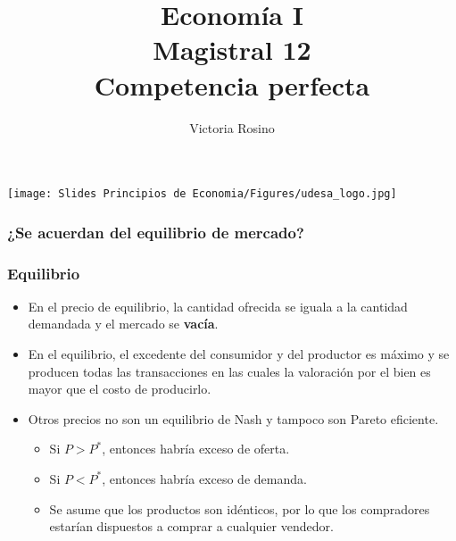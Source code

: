 \documentclass{beamer}
\title[Economía I]{Economía I \vspace{3mm}
\\ Magistral 12 \vspace{3mm} \\ Competencia perfecta}
\date{}
\author[Victoria Rosino]{Victoria Rosino}
\institute[]{Universidad de San Andrés}
\begin{document}
\begin{frame}
\vspace{0.3cm}
\titlepage
\centering
\vspace{-0.9cm}
\texttt{[image: Slides Principios de Economia/Figures/udesa\_logo.jpg]} 
\end{frame}


\begin{frame}
\frametitle{¿Se acuerdan del equilibrio de mercado?}
\begin{figure} [H]
\centering
{}
\end{figure} 
\end{frame}

\begin{frame}
\frametitle{Equilibrio}
\begin{itemize}
    \item En el precio de equilibrio, la cantidad ofrecida se iguala a la cantidad demandada y el mercado se \textbf{vacía}.
    \item En el equilibrio, el excedente del consumidor y del productor es máximo y se producen todas las transacciones en las cuales la valoración por el bien es mayor que el costo de producirlo.
    \item Otros precios no son un equilibrio de Nash y tampoco son Pareto eficiente.
    \begin{itemize}
        \item Si $P > P^{*}$, entonces habría exceso de oferta.
        \item Si $P < P^{*}$, entonces habría exceso de demanda.
        \item Se asume que los productos son idénticos, por lo que los compradores estarían dispuestos a comprar a cualquier vendedor.
    \end{itemize}
\end{itemize}
\end{frame}
\end{document}
